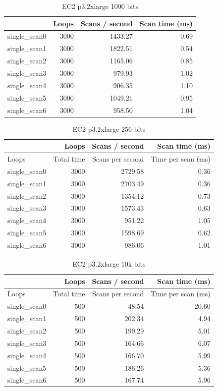 \begin{table}[!htb]
\centering
\begin{tabular}{| l | r | r | r |}
    \hline
    & Loops & Scans / second & Scan time (ms) \\ \hline
    single\_scan0 & 3000 & 1433.27 & 0.69 \\
    single\_scan1 & 3000 & 1822.51 & 0.54 \\
    single\_scan2 & 3000 & 1165.06 & 0.85 \\
    single\_scan3 & 3000 & 979.93 & 1.02 \\
    single\_scan4 & 3000 & 906.35 & 1.10 \\
    single\_scan5 & 3000 & 1049.21 & 0.95 \\
    single\_scan6 & 3000 & 958.50 & 1.04 \\
    \hline
\end{tabular}
\caption{EC2 p3.2xlarge 1000 bits
\label{tab:perf-imac-256}}
\end{table}

\begin{table}[!htb]
\centering
\begin{tabular}{| l | r | r | r |}
    \hline
    & Loops & Scans / second & Scan time (ms) \\ \hline
    Loops & Total time & Scans per second & Time per scan (ms) \\
    single\_scan0 & 3000 & 2729.58 & 0.36 \\
    single\_scan1 & 3000 & 2703.49 & 0.36 \\
    single\_scan2 & 3000 & 1354.12 & 0.73 \\
    single\_scan3 & 3000 & 1573.43 & 0.63 \\
    single\_scan4 & 3000 & 951.22 & 1.05 \\
    single\_scan5 & 3000 & 1598.69 & 0.62 \\
    single\_scan6 & 3000 & 986.06 & 1.01 \\
    \hline
\end{tabular}
\caption{EC2 p3.2xlarge 256 bits
\label{tab:perf-imac-256}}
\end{table}

\begin{table}[!htb]
\centering
\begin{tabular}{| l | r | r | r |}
    \hline
    & Loops & Scans / second & Scan time (ms) \\ \hline
    Loops & Total time & Scans per second & Time per scan (ms) \\
    single\_scan0 & 500 & 48.54 & 20.60 \\
    single\_scan1 & 500 & 202.34 & 4.94 \\
    single\_scan2 & 500 & 199.29 & 5.01 \\
    single\_scan3 & 500 & 164.66 & 6.07 \\
    single\_scan4 & 500 & 166.70 & 5.99 \\
    single\_scan5 & 500 & 186.26 & 5.36 \\
    single\_scan6 & 500 & 167.74 & 5.96 \\
    \hline
\end{tabular}
\caption{EC2 p3.2xlarge 10k bits
\label{tab:perf-imac-256}}
\end{table}

